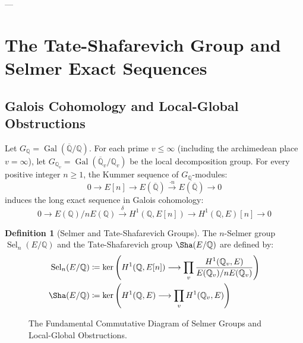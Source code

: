 \documentclass[11pt,a4paper]{article}
\theoremstyle{definition}
\newtheorem{definition}[theorem]{Definition}
\begin{document}
---

\section{The Tate-Shafarevich Group and Selmer Exact Sequences}

\subsection{Galois Cohomology and Local-Global Obstructions}
Let $G_{\mathbb{Q}} = \operatorname{Gal}(\overline{\mathbb{Q}}/\mathbb{Q})$. For each prime $v \le \infty$ (including the archimedean place $v = \infty$), let $G_{\mathbb{Q}_v} = \operatorname{Gal}(\overline{\mathbb{Q}}_v/\mathbb{Q}_v)$ be the local decomposition group.
For every positive integer $n \ge 1$, the Kummer sequence of $G_{\mathbb{Q}}$-modules:
\begin{equation}
0 \longrightarrow E[n] \longrightarrow E(\overline{\mathbb{Q}}) \xrightarrow{\cdot n} E(\overline{\mathbb{Q}}) \longrightarrow 0
\end{equation}
induces the long exact sequence in Galois cohomology:
\begin{equation}
0 \longrightarrow E(\mathbb{Q})/nE(\mathbb{Q}) \xrightarrow{\delta} H^1(\mathbb{Q}, E[n]) \longrightarrow H^1(\mathbb{Q}, E)[n] \longrightarrow 0
\end{equation}

\begin{definition}[Selmer and Tate-Shafarevich Groups]
The $n$-Selmer group $\operatorname{Sel}_n(E/\mathbb{Q})$ and the Tate-Shafarevich group $\Sha(E/\mathbb{Q})$ are defined by:
\begin{align}
\operatorname{Sel}_n(E/\mathbb{Q}) &\coloneqq \ker\left( H^1(\mathbb{Q}, E[n]) \longrightarrow \prod_v \frac{H^1(\mathbb{Q}_v, E)}{E(\mathbb{Q}_v)/nE(\mathbb{Q}_v)} \right) \\
\Sha(E/\mathbb{Q}) &\coloneqq \ker\left( H^1(\mathbb{Q}, E) \longrightarrow \prod_v H^1(\mathbb{Q}_v, E) \right)
\end{align}
\end{definition}

\begin{figure}[htbp]
\centering
{}
\caption{The Fundamental Commutative Diagram of Selmer Groups and Local-Global Obstructions.}
\label{fig:selmer_diagram}
\end{figure}
\end{document}
